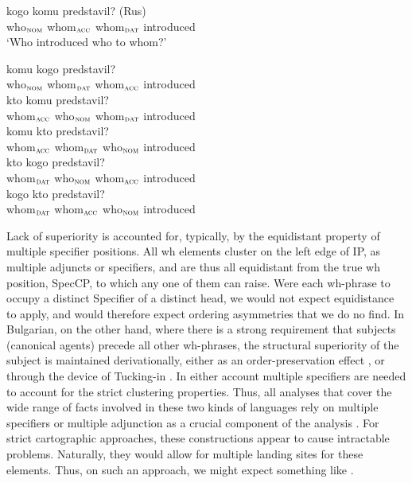 \documentclass[output=paper]{langscibook}
\begin{document}
\begin{exe}
\ex \label{bai11}

\begin{xlist}
\ex \label{bai11a}
		{kogo}		{komu}		{predstavil}? \hfill (Rus) \\
who$_{\textsc{nom}}$ whom$_{\textsc{acc}}$ whom$_{\textsc{dat}}$ introduced \\
\glt `Who introduced who to whom?'

\ex \label{bai11b}
			{komu}	{kogo}		{predstavil}? \\
who$_{\textsc{nom}}$  whom$_{\textsc{dat}}$ whom$_{\textsc{acc}}$ introduced \\

\ex \label{bai11c}
	{kto}			{komu}		{predstavil}? \\
whom$_{\textsc{acc}}$ who$_{\textsc{nom}}$  whom$_{\textsc{dat}}$  introduced \\

\ex \label{bai11d}
		{komu}		{kto}		{predstavil}? \\
whom$_{\textsc{acc}}$ whom$_{\textsc{dat}}$  who$_{\textsc{nom}}$  introduced \\

\ex \label{bai11e}
	{kto}		{kogo}		{predstavil}? \\
whom$_{\textsc{dat}}$  who$_{\textsc{nom}}$ whom$_{\textsc{acc}}$  introduced \\

\ex \label{bai11f}
	{kogo}	{kto}		{predstavil}? \\
whom$_{\textsc{dat}}$  whom$_{\textsc{acc}}$   who$_{\textsc{nom}}$ introduced \\

\end{xlist}
\end{exe}

Lack of superiority is accounted for, typically, by the equidistant property of multiple specifier positions. All wh elements cluster on the left edge of IP, as multiple adjuncts or specifiers, and are thus all equidistant from the true wh position, SpecCP, to which any one of them can raise. Were each wh-phrase to occupy a distinct Specifier of a distinct head, we would not expect equidistance to apply, and would therefore expect ordering asymmetries that we do no find. In Bulgarian, on the other hand, where there is a strong requirement that subjects (canonical agents) precede all other wh-phrases, the structural superiority of the subject is maintained derivationally, either as an order-preservation effect \citep{Bailyn2018}, or through the device of Tucking-in \citep{Richards.Norvin1997}. In either account multiple specifiers are needed to account for the strict clustering properties. Thus, all analyses that cover the wide range of facts involved in these two kinds of languages rely on multiple specifiers or multiple adjunction as a crucial component of the analysis \citep{Rudin1988,Richards.Norvin1997,Boskovic1997,Boskovic2002}. 
For strict cartographic approaches, these constructions appear to cause intractable problems. Naturally, they would allow for multiple landing sites for these elements. Thus, on such an approach, we might expect something like .
\end{document}
